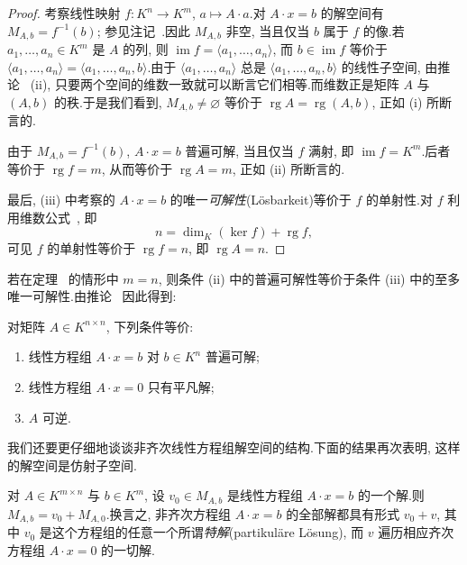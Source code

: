 \begin{proof}
考察线性映射 $f \colon K^n \longrightarrow K^m$, $a \longmapsto A \cdot a$.对 $A \cdot x = b$ 的解空间有 $M_{A, b} = f^{-1}(b)$; 参见注记~.因此 $M_{A, b}$ 非空, 当且仅当 $b$ 属于 $f$ 的像.若 $a_1, \ldots, a_n \in K^m$ 是 $A$ 的列, 则 $\operatorname{im} f = \langle a_1, \ldots, a_n \rangle$, 而 $b \in \operatorname{im} f$ 等价于 $\langle a_1, \ldots, a_n \rangle = \langle a_1, \ldots, a_n, b \rangle$.由于 $\langle a_1, \ldots, a_n \rangle$ 总是 $\langle a_1, \ldots, a_n, b \rangle$ 的线性子空间, 由推论~ (ii), 只要两个空间的维数一致就可以断言它们相等.而维数正是矩阵 $A$ 与 $(A, b)$ 的秩.于是我们看到, $M_{A, b} \neq \varnothing$ 等价于 $\operatorname{rg} A = \operatorname{rg}(A, b)$, 正如 (i) 所断言的.

由于 $M_{A, b} = f^{-1}(b)$, $A \cdot x = b$ 普遍可解, 当且仅当 $f$ 满射, 即 $\operatorname{im} f = K^m$.后者等价于 $\operatorname{rg} f = m$, 从而等价于 $\operatorname{rg} A = m$, 正如 (ii) 所断言的.

最后, (iii) 中考察的 $A \cdot x = b$ 的唯一\emph{可解性}(\textup{Lösbarkeit})等价于 $f$ 的单射性.对 $f$ 利用维数公式~, 即
\[
n = \dim_K(\ker f) + \operatorname{rg} f,
\]
可见 $f$ 的单射性等价于 $\operatorname{rg} f = n$, 即 $\operatorname{rg} A = n$.
\end{proof}

若在定理~ 的情形中 $m = n$, 则条件 (ii) 中的普遍可解性等价于条件 (iii) 中的至多唯一可解性.由推论~ 因此得到:

\begin{corollary}\label{cor:3.5.6}
对矩阵 $A \in K^{n \times n}$, 下列条件等价:
\begin{enumerate}
\item[(i)] 线性方程组 $A \cdot x = b$ 对 $b \in K^n$ 普遍可解;
\item[(ii)] 线性方程组 $A \cdot x = 0$ 只有平凡解;
\item[(iii)] $A$ 可逆.
\end{enumerate}
\end{corollary}

我们还要更仔细地谈谈非齐次线性方程组解空间的结构.下面的结果再次表明, 这样的解空间是仿射子空间.

\begin{theorem}\label{thm:3.5.7}
对 $A \in K^{m \times n}$ 与 $b \in K^m$, 设 $v_0 \in M_{A, b}$ 是线性方程组 $A \cdot x = b$ 的一个解.则 $M_{A, b} = v_0 + M_{A, 0}$.换言之, 非齐次方程组 $A \cdot x = b$ 的全部解都具有形式 $v_0 + v$, 其中 $v_0$ 是这个方程组的任意一个所谓\emph{特解}(\textup{partikuläre Lösung}), 而 $v$ 遍历相应齐次方程组 $A \cdot x = 0$ 的一切解.
\end{theorem}

